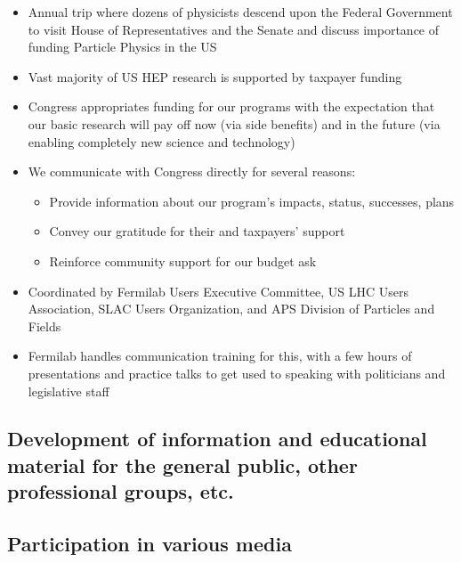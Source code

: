 \begin{itemize}
	\setlength{\itemsep}{0em}
	\item Annual trip where dozens of physicists descend upon the Federal Government to visit House of Representatives and the Senate and discuss importance of funding Particle Physics in the US
	\item Vast majority of US HEP research is supported by taxpayer funding
	\item Congress appropriates funding for our programs with the expectation that our basic research will pay off now (via side benefits) and in the future (via enabling completely new science and technology)
	\item We communicate with Congress directly for several reasons:
	      \begin{itemize}
		      \item Provide information about our program’s impacts, status, successes, plans
		      \item Convey our gratitude for their and taxpayers’ support
		      \item Reinforce community support for our budget ask
	      \end{itemize}
	\item Coordinated by Fermilab Users Executive Committee, US LHC Users Association, SLAC Users Organization, and APS Division of Particles and Fields
	\item Fermilab handles communication training for this, with a few hours of presentations and practice talks to get used to speaking with politicians and legislative staff
\end{itemize}

\subsection{Development of information and educational material for the general public, other professional groups, etc. \noneyet} \label{ssec:development-of-information-and-educational-material-for-the-general-public-other-professional-groups-etc-noneyet}
\subsection{Participation in various media} \label{ssec:participation-in-various-media}

